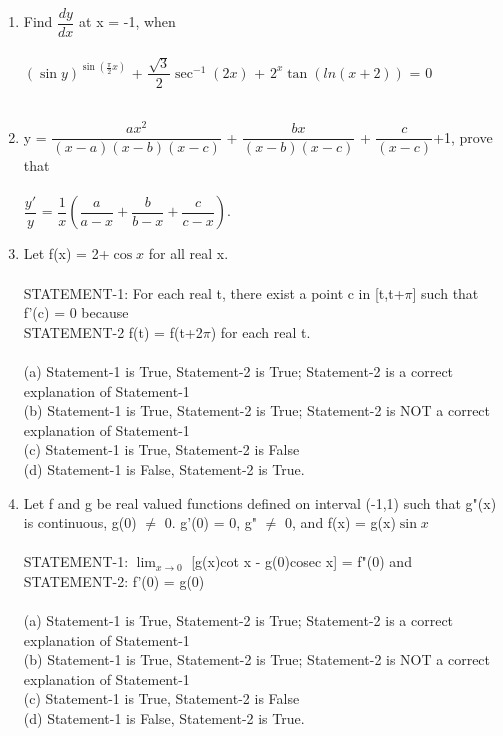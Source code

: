 \documentclass[journal,12pt,onecoloumn]{IEEEtran}
\begin{document}
\begin{enumerate}[label=\arabic*]
	\item Find $\dfrac{dy}{dx}$ at x = -1, when\\
	\\
	$(\sin y)^{\sin\left(\frac{\pi}{2} x \right)}$ + $\dfrac{\sqrt{3}}{2}\sec^{-1}(2x)$ + $2^x \tan(ln(x+2))$ = 0\\
	\\
	\item  y = $\dfrac{ax^2}{(x-a)(x-b)(x-c)}$ + $\dfrac{bx}{(x-b)(x-c)}$ + $\dfrac{c}{(x-c)}$+1, prove that\\
	\\
	 $\dfrac{y'}{y}$ = $\dfrac{1}{x}\left(\dfrac{a}{a-x}+\dfrac{b}{b-x}+\dfrac{c}{c-x}\right)$.\\
	\item Let f(x) = 2+$\cos x$ for all real x.
	\\
	\\
	STATEMENT-1: For each real t, there exist a point c in [t,t+$\pi$] such that f'(c) = 0 because\\
	STATEMENT-2 f(t) = f(t+2$\pi$) for each real t.\\
	\\
	(a) Statement-1 is True, Statement-2 is True; Statement-2 is a correct explanation of Statement-1\\
	(b) Statement-1 is True, Statement-2 is True; Statement-2 is NOT a correct explanation of Statement-1\\
	(c) Statement-1 is True, Statement-2 is False\\
	(d) Statement-1 is False, Statement-2 is True.\\
	\item Let f and g be real valued functions defined on interval (-1,1) such that g"(x) is continuous, g(0) $\neq$ 0. g'(0) = 0, g" $\neq$ 0, and f(x) = g(x)$\sin x$\\
	\\
	STATEMENT-1: $\displaystyle{\lim_{x \to 0}}$ [g(x)cot x - g(0)cosec x] = f"(0) and\\
	STATEMENT-2: f'(0) = g(0)\\
	\\
	(a) Statement-1 is True, Statement-2 is True; Statement-2 is a correct explanation of Statement-1\\
	(b) Statement-1 is True, Statement-2 is True; Statement-2 is NOT a correct explanation of Statement-1\\
	(c) Statement-1 is True, Statement-2 is False\\
	(d) Statement-1 is False, Statement-2 is True.\\

\end{enumerate}
\end{document}
